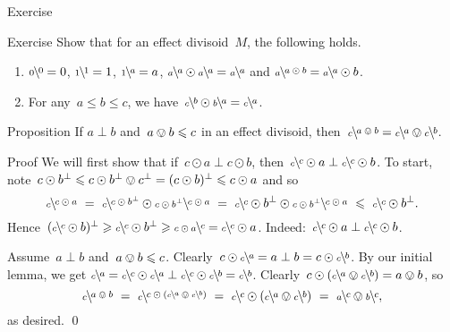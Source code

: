 \documentclass[b]{subfiles}
\begin{document}
\begin{parsec}
\begin{point}{Exercise}
\end{point}
\begin{point}{Exercise}%
Show that for an effect divisoid~$M$, the following holds.
\begin{enumerate}
\item
    $\rfrac{0}{0}=0$, $\rfrac{1}{1}=1$, $\rfrac{a}{1}=a$, $\rfrac{a}{a} \odot \rfrac{a}{a} = \rfrac{a}{a}$ and
    $\rfrac{a \odot b}{a} = \rfrac{a}{a }\odot b$.
\item
    For any~$a \leq b \leq c$,
    we have~$\rfrac{b}{c} \odot \rfrac{a}{b} = \rfrac{a}{c}$.
\end{enumerate}
\end{point}
\begin{point}{Proposition}%
If $a \perp b$ and~$a \ovee b \leq c$ in an effect divisoid,
then~$\rfrac{a \ovee b}{c } = \rfrac{a}{c} \ovee \rfrac{b}{c}$.
\begin{point}{Proof}%
We will first show that if~$c \odot a \perp c \odot b$,
    then~$\rfrac{c}{c} \odot a \perp \rfrac{c}{c}\odot b$.
To start,
    note~$c \odot b^\perp \leq c \odot b^\perp \ovee c^\perp
        = (c \odot b)^\perp \leq c \odot a$
        and so
\begin{equation*}
     \rfrac{c \odot a}{c} 
     \ = \ 
            \rfrac{c \odot b^\perp}{c} \odot
            \rfrac{c \odot a}{c \odot b^\perp}
     \ = \ 
            \rfrac{c}{c} \odot b^\perp \odot
            \rfrac{c \odot a}{c \odot b^\perp}
    \ \leq \ \rfrac{c}{c} \odot b^\perp.
\end{equation*}
Hence~$(\rfrac{c}{c}\odot b)^\perp
            \geq \rfrac{c}{c} \odot b^\perp
            \geq \rfrac{c}{c \odot a}
            = \rfrac{c}{c} \odot a $.
    Indeed:~$\rfrac{c}{c}\odot a \perp \rfrac{c}{c} \odot b$.
\begin{point}%
Assume~$a\perp b$ and~$a\ovee b \leq c$. 
Clearly~$c \odot \rfrac{a}{c}  = a \perp b = c \odot \rfrac{b}{c}$.
By our initial lemma, we get
    $\rfrac{a}{c } =
    \rfrac{c}{c} \odot \rfrac{a}{c} \perp
    \rfrac{c}{c} \odot \rfrac{b}{c} =
    \rfrac{b}{c }
$.
Clearly~$c \odot (\rfrac{a}{c} \ovee \rfrac{b}{c}) = a \ovee b$, so
\begin{equation*}
    \rfrac{a \ovee b}{c} \ = \  
    \rfrac{c \odot (\rfrac{a}{c} \ovee \rfrac{b}{c})}{c} \ = \ 
\rfrac{c}{c} \odot (\rfrac{a}{c} \ovee \rfrac{b}{c}) \ = \ 
\rfrac{c}{a} \ovee \rfrac{c}{b},
\end{equation*}
as desired. \qed
\end{point}
\end{point}
\end{point}
\end{parsec}
\end{document}
